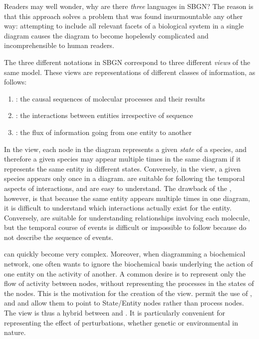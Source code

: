 Readers may well wonder, why are there \emph{three} languages in SBGN?  The reason is that this approach solves a problem that was found insurmountable any other way: attempting to include all relevant facets of a biological system in a single diagram causes the diagram to become hopelessly complicated and incomprehensible to human readers.

The three different notations in SBGN correspond to three different \emph{views} of the same model.  These views are representations of different classes of information, as follows:

\begin{enumerate}\setlength{\parskip}{0ex}

\item \emph{\PD{}}: the causal sequences of molecular processes and their
  results

\item \emph{\ER{}}: the interactions between entities irrespective of
sequence

\item \emph{\AF{}}: the flux of information going from one entity to
another

\end{enumerate}

In the \PD{} view, each node in the diagram represents a given \emph{state} of a species, and therefore a given species may appear multiple times in the same diagram if it represents the same entity in different states.  Conversely, in the \ER{} view, a given species appears only once in a diagram.  \PDs{} are suitable for following the temporal aspects of interactions, and are easy to understand.  The drawback of the \PD{}, however, is that because the same entity appears multiple times in one diagram, it is difficult to understand which interactions actually exist for the entity.  Conversely, \ERs{} are suitable for understanding relationships involving each molecule, but the temporal course of events is difficult or impossible to follow because \ERs do not describe the sequence of events.

\PDs{} can quickly become very complex.  Moreover, when diagramming a biochemical network, one often wants to ignore the biochemical basis underlying the action of one entity on the activity of another.  A common desire is to represent only the flow of activity between nodes, without representing the processes in the states of the nodes.  This is the motivation for the creation of the \AF view.  \AFs permit the use of ,  and  and allow them to point to State/Entity nodes rather than process nodes.  The \AF view is thus a hybrid between \PD and \ERs.  It is particularly convenient for representing the effect of perturbations, whether genetic or environmental in nature.

